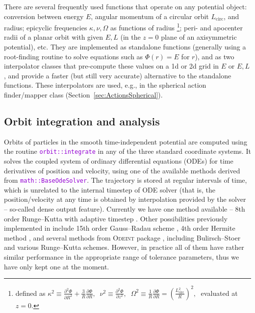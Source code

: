 \documentclass[12pt]{article}
\newcommand{\ttt}[1]{\textcolor{darkviolet}{\texttt{#1}}}
\renewcommand{\d}{\partial}
\begin{document}
There are several frequently used functions that operate on any potential object: conversion between energy $E$, angular momentum of a circular orbit $L_\mathrm{circ}$, and radius; epicyclic frequencies $\kappa,\nu,\Omega$ as functions of radius%
\footnote{defined as $\displaystyle \kappa^2\equiv \frac{\d^2\Phi}{\d R^2} + \frac 3 R \frac{\d\Phi}{\d R},\;\; \nu^2\equiv \frac{\d^2\Phi}{\d z^2},\;\; \Omega^2\equiv \frac 1 R \frac{\d\Phi}{\d R} = \left(\frac{L_\mathrm{circ}^2}{R}\right)^2,\;$ evaluated at $z=0$.};
peri- and apocenter radii of a planar orbit with given $E,L$ (in the $z=0$ plane of an axisymmetric potential), etc. They are implemented as standalone functions (generally using a root-finding routine to solve equations such as $\Phi(r)=E$ for $r$), and as two interpolator classes that pre-compute these values on a 1d or 2d grid in $E$ or $E,L$, and provide a faster (but still very accurate) alternative to the standalone functions. These interpolators are used, e.g., in the spherical action finder/mapper class (Section~\ref{sec:ActionsSpherical}).


\subsection{Orbit integration and analysis}  \label{sec:Orbits}

Orbits of particles in the smooth time-independent potential are computed using the routine \ttt{orbit::integrate} in any of the three standard coordinate systems. It solves the coupled system of ordinary differential equations (ODEs) for time derivatives of position and velocity, using one of the available methods derived from \ttt{math::BaseOdeSolver}. The trajectory is stored at regular intervals of time, which is unrelated to the internal timestep of ODE solver (that is, the  position/\-velocity at any time is obtained by interpolation provided by the solver -- so-called dense output feature). Currently we have one method available -- 8th order Runge--Kutta with adaptive timestep \cite{DOP853}. Other possibilities previously implemented in \cite{Vasiliev2013} include 15th order Gauss--Radau scheme \cite{IAS15}, 4th order Hermite method \cite{Hermite}, and several methods from \textsc{Odeint} package \cite{odeint}, including Bulirsch--Stoer and various Runge--Kutta schemes. However, in practice all of them have rather similar performance in the appropriate range of tolerance parameters, thus we have only kept one at the moment.
\end{document}
